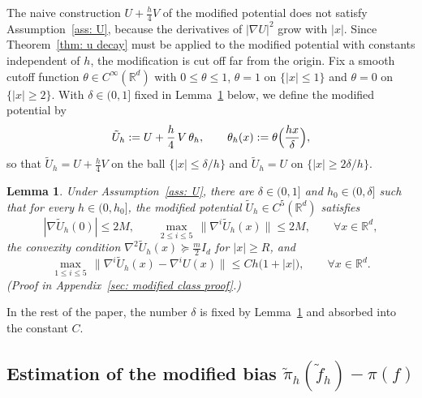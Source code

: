 \documentclass{article}
\newtheorem{lemma}{Lemma}
\newcommand{\Le}{\leqslant}
\newcommand{\Ge}{\geqslant}
\newcommand{\norm}[1]{\lVert #1 \rVert}
\numberwithin{equation}{section}
\begin{document}
The naive construction $U + \frac h4 V$ of the modified potential does not satisfy Assumption~\ref{ass: U}, because the derivatives of $|\nabla U|^2$ grow with $|x|$. Since Theorem~\ref{thm: u decay} must be applied to the modified potential with constants independent of $h$, the modification is cut off far from the origin. Fix a smooth cutoff function $\theta \in C^\infty(\mathbb R^d)$ with $0 \Le \theta \Le 1$, $\theta = 1$ on $\{|x| \Le 1\}$ and $\theta = 0$ on $\{|x| \Ge 2\}$. With $\delta \in (0,1]$ fixed in Lemma~\ref{lem: modified class} below, we define the modified potential by
\begin{equation}
    \tilde U_h := U + \frac h4\, V\, \theta_h , \qquad \theta_h(x) := \theta\Bigl( \frac{h x}{\delta} \Bigr) ,
    \label{eq: modified potential}
\end{equation}
so that $\tilde U_h = U + \frac h4 V$ on the ball $\{|x| \Le \delta/h\}$ and $\tilde U_h = U$ on $\{|x| \Ge 2\delta/h\}$.

\begin{lemma}
\label{lem: modified class}
    Under Assumption~\ref{ass: U}, there are $\delta \in (0,1]$ and $h_0 \in (0, \delta]$ such that for every $h \in (0,h_0]$, the modified potential $\tilde U_h \in C^5(\mathbb R^d)$ satisfies
    \begin{equation}
        |\nabla \tilde U_h(0)| \Le 2M , \qquad \max_{2 \Le i \Le 5}\, \norm{\nabla^i \tilde U_h(x)} \Le 2M , \qquad \forall x \in \mathbb R^d ,
        \label{eq: modified class bounds}
    \end{equation}
    the convexity condition $\nabla^2 \tilde U_h(x) \succeq \frac m2 I_d$ for $|x| \Ge R$, and
    \begin{equation}
        \max_{1 \Le i \Le 5}\, \norm{\nabla^i \tilde U_h(x) - \nabla^i U(x)} \Le C h \bigl( 1 + |x| \bigr) , \qquad \forall x \in \mathbb R^d .
        \label{eq: modified class}
    \end{equation}
    \emph{(Proof in Appendix~\ref{sec: modified class proof}.)}
\end{lemma}

In the rest of the paper, the number $\delta$ is fixed by Lemma~\ref{lem: modified class} and absorbed into the constant $C$.

\subsection{Estimation of the modified bias $\tilde\pi_h(\tilde f_h) - \pi(f)$}
\label{subsec: modified bias}
\end{document}
